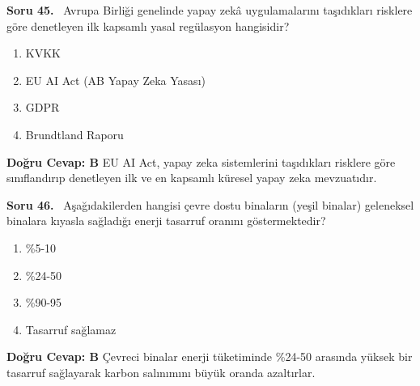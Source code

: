 \documentclass[11pt,a4paper,openany]{book}
\begin{document}
\needspace{5cm}
\vspace{8pt}
\noindent\textbf{\large\sffamily Soru 45.} \ Avrupa Birliği genelinde yapay zekâ uygulamalarını taşıdıkları risklere göre denetleyen ilk kapsamlı yasal regülasyon hangisidir?
\begin{enumerate}[label=\Alph*), leftmargin=25pt, topsep=4pt, itemsep=2pt]
    \item KVKK
    \item EU AI Act (AB Yapay Zeka Yasası)
    \item GDPR
    \item Brundtland Raporu
\end{enumerate}
\vspace{4pt}
\begin{tcolorbox}[title=Cevap ve Açıklama, colback=gray!3!white, colframe=primarycolor!90!black, arc=2mm, fonttitle=\bfseries\sffamily, top=6pt, bottom=6pt]
    \textbf{Doğru Cevap: B}
    \vspace{2pt}
    EU AI Act, yapay zeka sistemlerini taşıdıkları risklere göre sınıflandırıp denetleyen ilk ve en kapsamlı küresel yapay zeka mevzuatıdır.
\end{tcolorbox}
\vspace{10pt}

\needspace{5cm}
\vspace{8pt}
\noindent\textbf{\large\sffamily Soru 46.} \ Aşağıdakilerden hangisi çevre dostu binaların (yeşil binalar) geleneksel binalara kıyasla sağladığı enerji tasarruf oranını göstermektedir?
\begin{enumerate}[label=\Alph*), leftmargin=25pt, topsep=4pt, itemsep=2pt]
    \item \%5-10
    \item \%24-50
    \item \%90-95
    \item Tasarruf sağlamaz
\end{enumerate}
\vspace{4pt}
\begin{tcolorbox}[title=Cevap ve Açıklama, colback=gray!3!white, colframe=primarycolor!90!black, arc=2mm, fonttitle=\bfseries\sffamily, top=6pt, bottom=6pt]
    \textbf{Doğru Cevap: B}
    \vspace{2pt}
    Çevreci binalar enerji tüketiminde \%24-50 arasında yüksek bir tasarruf sağlayarak karbon salınımını büyük oranda azaltırlar.
\end{tcolorbox}
\vspace{10pt}
\end{document}
